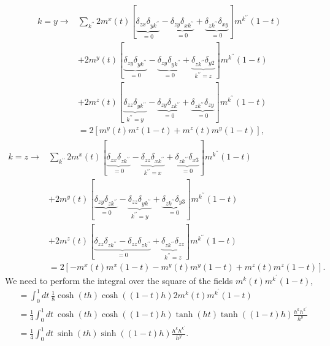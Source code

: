 \begin{align*}
    k=y \rightarrow  &\sum_{k^{\prime\prime}} 2m^{x}(t)[
    \underbrace{\delta_{zx}\delta_{yk^{\prime\prime}}}_{=0} - 
    \underbrace{\delta_{zy}\delta_{xk^{\prime\prime}}}_{=0} + 
    \underbrace{\delta_{zk^{\prime\prime}}\delta_{xy}}_{=0} ] m^{k^{\prime\prime}}(1-t)\\
    &+ 2m^{y}(t)[
    \underbrace{\delta_{zy}\delta_{yk^{\prime\prime}}}_{=0} - 
    \underbrace{\delta_{zy}\delta_{yk^{\prime\prime}}}_{=0} + 
    \underbrace{\delta_{zk^{\prime\prime}}\delta_{y2}}_{k^{\prime\prime}=z} ] m^{k^{\prime\prime}}(1-t)\\
    &+ 2m^{z}(t)[
    \underbrace{\delta_{zz}\delta_{yk^{\prime\prime}}}_{k^{\prime\prime}=y} - 
    \underbrace{\delta_{zy}\delta_{zk^{\prime\prime}}}_{=0} + 
    \underbrace{\delta_{zk^{\prime\prime}}\delta_{zy}}_{=0} ] m^{k^{\prime\prime}}(1-t)\\
    & = 2[m^{y}(t) m^{z}(1-t) + m^{z}(t) m^{y}(1-t)],
\end{align*}
\begin{align*}
    k=z \rightarrow  &\sum_{k^{\prime\prime}} 2m^{x}(t)[
    \underbrace{\delta_{zx}\delta_{zk^{\prime\prime}}}_{=0} - 
    \underbrace{\delta_{zz}\delta_{xk^{\prime\prime}}}_{k^{\prime\prime}=x} + 
    \underbrace{\delta_{zk^{\prime\prime}}\delta_{x3}}_{=0} ] m^{k^{\prime\prime}}(1-t)\\
    &+ 2m^{y}(t)[
    \underbrace{\delta_{zy}\delta_{zk^{\prime\prime}}}_{=0} - 
    \underbrace{\delta_{zz}\delta_{yk^{\prime\prime}}}_{k^{\prime\prime}=y} + 
    \underbrace{\delta_{zk^{\prime\prime}}\delta_{y3}}_{=0} ] m^{k^{\prime\prime}}(1-t)\\
    &+ 2m^{z}(t)[
    \underbrace{\delta_{zz}\delta_{zk^{\prime\prime}} - 
    \delta_{zz}\delta_{zk^{\prime\prime}}}_{=0} + 
    \underbrace{\delta_{zk^{\prime\prime}}\delta_{zz}}_{k^{\prime\prime}=z} ] m^{k^{\prime\prime}}(1-t)\\
    & = 2[-m^{x}(t) m^{x}(1-t) - m^{y}(t) m^{y}(1-t) + m^{z}(t) m^{z}(1-t)].
\end{align*}
We need to perform the integral over the square of the fields $m^k(t) m^{k^\prime}(1-t)$,
\begin{align*}
    &= \int_{0}^1 dt\: \frac{1}{8}\cosh(th)\cosh((1-t)h) 2m^k(t) m^{k^\prime}(1-t)\\
    &= \frac{1}{4}\int_{0}^1 dt\: \cosh(th)\cosh((1-t)h)\tanh(ht)\tanh((1-t)h) \frac{h^k h^{k^\prime}}{h^y}\\
    &= \frac{1}{4}\int_{0}^1 dt\: \sinh(th)\sinh((1-t)h) \frac{h^k h^{k^\prime}}{h^y}.
\end{align*}
